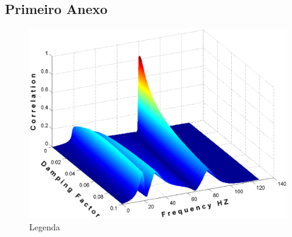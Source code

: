 \begin{anexosenv}

\partanexos

\chapter{Primeiro Anexo}
\label{appendix:anexo_certificado}
\begin{figure}
    \centering
    \includegraphics[width=15cm,scale=0.8]{figuras/fig01.eps}
    \caption{Legenda}
    \label{fig:Legenda}
\end{figure}

\end{anexosenv}

